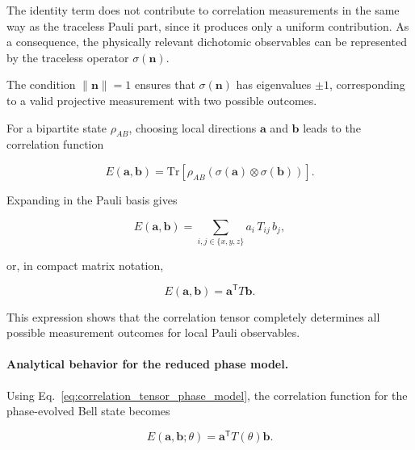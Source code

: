 \medskip

The identity term does not contribute to correlation measurements in the same way as the traceless Pauli part, since it produces only a uniform contribution. As a consequence, the physically relevant dichotomic observables can be represented by the traceless operator \( \sigma(\mathbf{n}) \).

The condition \( \|\mathbf{n}\| = 1 \) ensures that \( \sigma(\mathbf{n}) \) has eigenvalues \( \pm 1 \), corresponding to a valid projective measurement with two possible outcomes.

\medskip

For a bipartite state \( \rho_{AB} \), choosing local directions \( \mathbf{a} \) and \( \mathbf{b} \) leads to the correlation function

\begin{equation}
E(\mathbf{a},\mathbf{b})
=
\mathrm{Tr}
\left[
\rho_{AB}
\left(
\sigma(\mathbf{a}) \otimes \sigma(\mathbf{b})
\right)
\right].
\label{eq:axis_correlation_trace}
\end{equation}

Expanding in the Pauli basis gives

\begin{equation}
E(\mathbf{a},\mathbf{b})
=
\sum_{i,j \in \{x,y,z\}}
a_i\,T_{ij}\,b_j,
\label{eq:axis_correlation_component_form}
\end{equation}

or, in compact matrix notation,

\begin{equation}
E(\mathbf{a},\mathbf{b})
=
\mathbf{a}^{\mathsf T} T \mathbf{b}.
\label{eq:axis_correlation_tensor_form}
\end{equation}

\medskip

This expression shows that the correlation tensor completely determines all possible measurement outcomes for local Pauli observables.

\medskip

\paragraph{Analytical behavior for the reduced phase model.}

Using Eq.~\eqref{eq:correlation_tensor_phase_model}, the correlation function for the phase-evolved Bell state becomes

\begin{equation}
E(\mathbf{a},\mathbf{b};\theta)
=
\mathbf{a}^{\mathsf T} T(\theta) \mathbf{b}.
\label{eq:phase_model_axis_correlation}
\end{equation}

